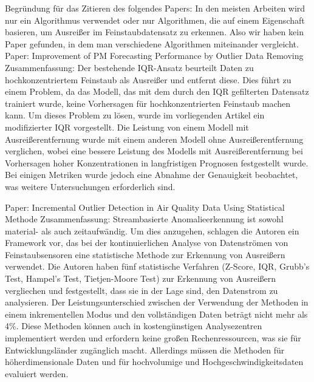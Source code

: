 Begründung für das Zitieren des folgendes Papers: In den meisten Arbeiten wird nur ein Algorithmus verwendet oder nur Algorithmen, die auf einem Eigenschaft basieren, um Ausreißer im Feinstaubdatensatz zu erkennen. Also wir haben kein Paper gefunden, in dem man verschiedene Algorithmen miteinander vergleicht.
Paper: Improvement of PM Forecasting Performance by Outlier Data Removing
Zusammenfassung: Der bestehende IQR-Ansatz beurteilt Daten zu hochkonzentriertem Feinstaub als Ausreißer und entfernt diese. Dies führt zu einem Problem, da das Modell, das mit dem durch den IQR gefilterten Datensatz trainiert wurde, keine Vorhersagen für hochkonzentrierten Feinstaub machen kann. Um dieses Problem zu lösen, wurde im vorliegenden Artikel ein modifizierter IQR vorgestellt. Die Leistung von einem Modell mit Ausreißerentfernung wurde mit einem anderen Modell ohne Ausreißerentfernung verglichen, wobei eine bessere Leistung des Modells mit Ausreißerentfernung bei Vorhersagen hoher Konzentrationen in langfristigen Prognosen festgestellt wurde. Bei einigen Metriken wurde jedoch eine Abnahme der Genauigkeit beobachtet, was weitere Untersuchungen erforderlich sind.

Paper: Incremental Outlier Detection in Air Quality Data Using Statistical Methode
Zusammenfassung: Streambasierte Anomalieerkennung ist sowohl material- als auch zeitaufwändig. Um dies anzugehen, schlagen die Autoren ein Framework vor, das bei der kontinuierlichen Analyse von Datenströmen von Feinstaubsensoren eine statistische Methode zur Erkennung von Ausreißern verwendet. Die Autoren haben fünf statistische Verfahren (Z-Score, IQR, Grubb's Test, Hampel's Test, Tietjen-Moore Test) zur Erkennung von Ausreißern vergliechen und festgestellt, dass sie in der Lage sind, den Datenstrom zu analysieren. Der Leistungsunterschied zwischen der Verwendung der Methoden in einem inkrementellen Modus und den vollständigen Daten beträgt nicht mehr als 4\%. Diese Methoden können auch in kostengünstigen Analysezentren implementiert werden und erfordern keine großen Rechenressourcen, was sie für Entwicklungsländer zugänglich macht. Allerdings müssen die Methoden für höherdimensionale Daten und für hochvolumige und Hochgeschwindigkeitsdaten evaluiert werden.

